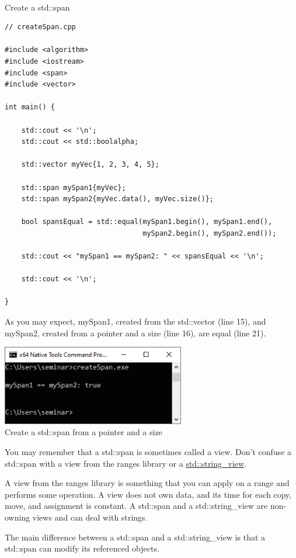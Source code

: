 \hspace*{\fill} \\ %
\noindent
Create a std::span
\begin{lstlisting}[style=styleCXX]
// createSpan.cpp

#include <algorithm>
#include <iostream>
#include <span>
#include <vector>

int main() {
	
	std::cout << '\n';
	std::cout << std::boolalpha;
	
	std::vector myVec{1, 2, 3, 4, 5};
	
	std::span mySpan1{myVec};
	std::span mySpan2{myVec.data(), myVec.size()};
	
	bool spansEqual = std::equal(mySpan1.begin(), mySpan1.end(),
	                             mySpan2.begin(), mySpan2.end());
	
	std::cout << "mySpan1 == mySpan2: " << spansEqual << '\n';
	
	std::cout << '\n';

}
\end{lstlisting}

As you may expect, mySpan1, created from the std::vector (line 15), and mySpan2, created from a pointer and a size (line 16), are equal (line 21).

\begin{center}
\includegraphics[width=0.6\textwidth]{content/3/chapter5/images/6.png}\\
Create a std::span from a pointer and a size
\end{center}

\begin{tcolorbox}[breakable,enhanced jigsaw,colback=red!5!white,colframe=red!75!black,title={A std::span is neither a std::string\_view nor a view}]
You may remember that a std::span is sometimes called a view. Don’t confuse a std::span with a view from the ranges library or a \href{https://www.modernescpp.com/index.php/c-17-what-s-new-in-the-library}{std::string\_view}.

A view from the ranges library is something that you can apply on a range and performs some operation. A view does not own data, and its time for each copy, move, and assignment is constant. A std::span and a std::string\_view are non-owning views and can deal with strings.

The main difference between a std::span and a std::string\_view is that a std::span can modify its referenced objects.
\end{tcolorbox}
	
